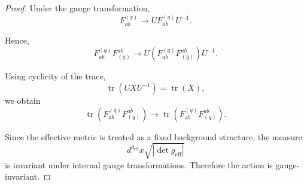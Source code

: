 \documentclass[10pt,a4paper]{amsart}
\begin{document}
\begin{proof}

Under the gauge transformation,
\[
F_{ab}^{(q)}
\longrightarrow
U F_{ab}^{(q)} U^{-1}.
\]

Hence,
\[
F_{ab}^{(q)}F_{(q)}^{ab}
\longrightarrow
U
\left(
F_{ab}^{(q)}F_{(q)}^{ab}
\right)
U^{-1}.
\]

Using cyclicity of the trace,
\[
\operatorname{tr}(UXU^{-1})
=
\operatorname{tr}(X),
\]
we obtain
\[
\operatorname{tr}
\left(
F_{ab}^{(q)}F_{(q)}^{ab}
\right)
\longrightarrow
\operatorname{tr}
\left(
F_{ab}^{(q)}F_{(q)}^{ab}
\right).
\]

Since the effective metric is treated as a fixed background structure, the measure
\[
d^{d_{\mathrm{eff}}}x
\sqrt{
\left|
\det g_{\mathrm{eff}}
\right|
}
\]
is invariant under internal gauge transformations. Therefore the action is gauge-invariant.

\end{proof}
\end{document}
